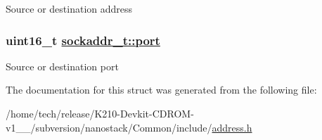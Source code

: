 Source or destination address \hypertarget{structsockaddr__t_b4544bc9ff62d1a9facbdf7a3ffcc8d2}{
\subsubsection[port]{\setlength{\rightskip}{0pt plus 5cm}uint16\_\-t \hyperlink{structsockaddr__t_b4544bc9ff62d1a9facbdf7a3ffcc8d2}{sockaddr\_\-t::port}}}
\label{structsockaddr__t_b4544bc9ff62d1a9facbdf7a3ffcc8d2}


Source or destination port 

The documentation for this struct was generated from the following file:\begin{CompactItemize}
\item 
/home/tech/release/K210-Devkit-CDROM-v1\_\_/subversion/nanostack/Common/include/\hyperlink{address_8h}{address.h}\end{CompactItemize}
